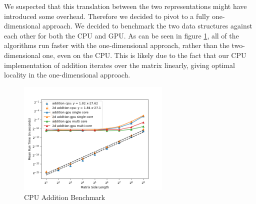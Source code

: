 We suspected that this translation between the two representations might have introduced some overhead. Therefore we decided to pivot to a fully one-dimensional approach. We decided to benchmark the two data structures against each other for both the CPU and GPU. As can be seen in figure \ref{fig:1d_vs_2d_bench}, all of the algorithms run faster with the one-dimensional approach, rather than the two-dimensional one, even on the CPU. This is likely due to the fact that our CPU implementation of addition iterates over the matrix linearly, giving optimal locality in the one-dimensional approach.

\begin{figure}[ht]
    \centering
    \includegraphics[width=0.65\textwidth]{SavedBenchmarksAndDiagrams/Machine 2/2D vs 1D.png}
    \caption{CPU Addition Benchmark}
    \label{fig:1d_vs_2d_bench}
\end{figure}
